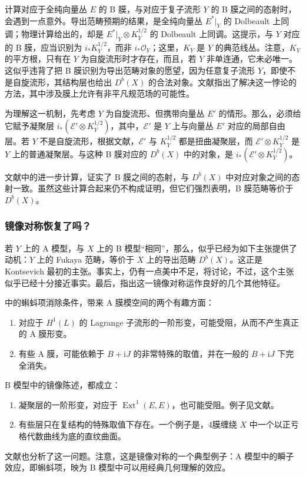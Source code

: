 计算对应于全纯向量丛 $E$ 的 B 膜，与对应于复子流形 $Y$ 的 B 膜之间的态射时，会遇到一点意外。导出范畴预期的结果，是全纯向量丛 $E^*|_Y$ 的 Dolbeault 上同调；物理计算给出的，却是 $E^*|_Y\otimes K_Y^{1/2}$ 的 Dolbeault 上同调。这提示，与 $Y$ 对应的 B 膜，应当识别为 $i_*K_Y^{1/2}$，而非 $i_*\mathcal{O}_Y$；这里，$K_Y$ 是 $Y$ 的典范线丛。注意，$K_Y$ 的平方根，只有在 $Y$ 为自旋流形时才存在，而且，若 $Y$ 非单连通，它未必唯一。这似乎违背了把 B 膜识别为导出范畴对象的愿望，因为任意复子流形 $Y$，即使不是自旋流形，其结构层也给出 $D^b(X)$ 的合法对象。文献指出了解决这一悖论的方法，其中涉及膜上允许有非平凡规范场的可能性。

为理解这一机制，先考虑 $Y$ 为自旋流形、但携带向量丛 $E'$ 的情形。那么，必须给它赋予凝聚层 $i_*(\mathcal{E}'\otimes K_Y^{1/2})$，其中，$\mathcal{E}'$ 是 $Y$ 上与向量丛 $E'$ 对应的局部自由层。若 $Y$ 不是自旋流形，根据文献，$\mathcal{E}'$ 与 $K_Y^{1/2}$ 都是扭曲凝聚层，而 $\mathcal{E}'\otimes K_Y^{1/2}$ 是 $Y$ 上的普通凝聚层。与这种 B 膜对应的 $D^b(X)$ 中的对象，是 $i_*(\mathcal{E}'\otimes K_Y^{1/2})$。

文献中的进一步计算，证实了 B 膜之间的态射，与 $D^b(X)$ 中对应对象之间的态射一致。虽然这些计算合起来仍不构成证明，但它们强烈表明，B 膜范畴等价于 $D^b(X)$。

\subsubsection{镜像对称恢复了吗？}\label{sec:5.3.3.5}

若 $Y$ 上的 A 模型，与 $X$ 上的 B 模型“相同”，那么，似乎已经为如下主张提供了动机：$Y$ 上的 Fukaya 范畴，等价于 $X$ 上的导出范畴 $D^b(X)$。这正是 Kontsevich 最初的主张。事实上，仍有一点美中不足，将讨论，不过，这个主张似乎已经十分接近事实。最后，指出这一镜像对称运作良好的几个其他特征。

中的蝌蚪项消除条件，带来 A 膜模空间的两个有趣方面：
\begin{enumerate}[label=(\arabic*)]
\item 对应于 $H^1(L)$ 的 Lagrange 子流形的一阶形变，可能受阻，从而不产生真正的 A 膜形变。
\item 有些 A 膜，可能依赖于 $B+\mathrm{i}J$ 的非常特殊的取值，并在一般的 $B+\mathrm{i}J$ 下完全消失。
\end{enumerate}
B 模型中的镜像陈述，都成立：
\begin{enumerate}[label=(\arabic*)]
\item 凝聚层的一阶形变，对应于 $\operatorname{Ext}^1(E,E)$，也可能受阻。例子见文献。
\item 有些层只在复结构的特殊取值下存在。一个例子是，4膜缠绕 $X$ 中一个以正亏格代数曲线为底的直纹曲面。
\end{enumerate}
文献也分析了这一问题。注意，这是镜像对称的一个典型例子：A 模型中的瞬子效应，即蝌蚪项，映为 B 模型中可以用经典几何理解的效应。


